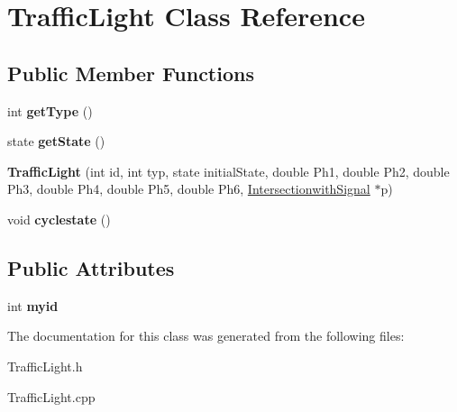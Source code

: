 \hypertarget{class_traffic_light}{\section{Traffic\-Light Class Reference}
\label{class_traffic_light}
}
\subsection*{Public Member Functions}
\begin{DoxyCompactItemize}
\item 
\hypertarget{class_traffic_light_abce2ada7d1eeb16437d07acd50b2446b}{int {\bfseries get\-Type} ()}\label{class_traffic_light_abce2ada7d1eeb16437d07acd50b2446b}

\item 
\hypertarget{class_traffic_light_aaee73cd4cff5ad4f7096c7c8e9e6bc4b}{state {\bfseries get\-State} ()}\label{class_traffic_light_aaee73cd4cff5ad4f7096c7c8e9e6bc4b}

\item 
\hypertarget{class_traffic_light_ad3bb62de50352123ffa6d67b4cbd028f}{{\bfseries Traffic\-Light} (int id, int typ, state initial\-State, double Ph1, double Ph2, double Ph3, double Ph4, double Ph5, double Ph6, \hyperlink{class_intersectionwith_signal}{Intersectionwith\-Signal} $\ast$p)}\label{class_traffic_light_ad3bb62de50352123ffa6d67b4cbd028f}

\item 
\hypertarget{class_traffic_light_a069a58acd9a0b2ecb9245912b53c4462}{void {\bfseries cyclestate} ()}\label{class_traffic_light_a069a58acd9a0b2ecb9245912b53c4462}

\end{DoxyCompactItemize}
\subsection*{Public Attributes}
\begin{DoxyCompactItemize}
\item 
\hypertarget{class_traffic_light_aa8b8852f0a75b737d741cdb831847208}{int {\bfseries myid}}\label{class_traffic_light_aa8b8852f0a75b737d741cdb831847208}

\end{DoxyCompactItemize}


The documentation for this class was generated from the following files\-:\begin{DoxyCompactItemize}
\item 
Traffic\-Light.\-h\item 
Traffic\-Light.\-cpp\end{DoxyCompactItemize}
